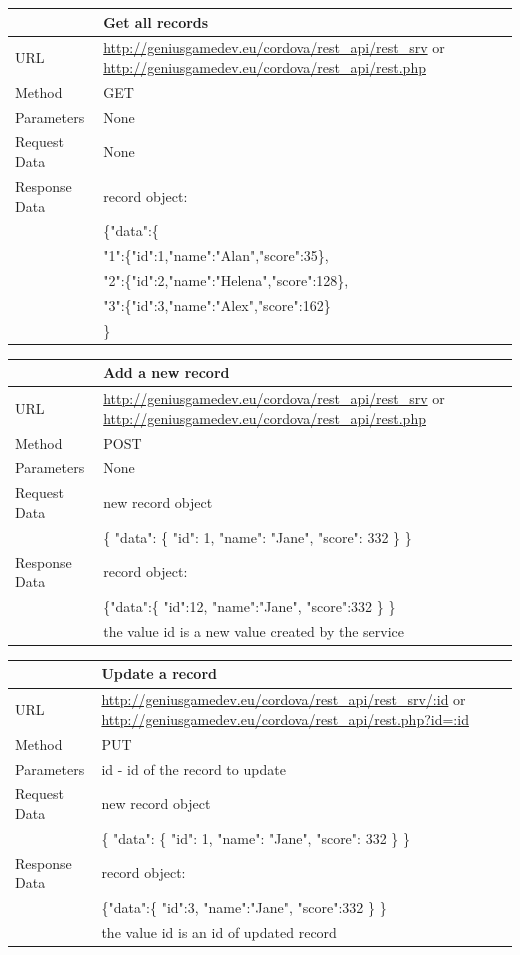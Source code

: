 \begin{tabularx}{\textwidth}{|l|X|}
\hline
&\textbf{Get all records}\\\hline
URL &   \url{http://geniusgamedev.eu/cordova/rest_api/rest_srv} or \url{http://geniusgamedev.eu/cordova/rest_api/rest.php}\\\hline
Method  & GET\\\hline
Parameters  & None \\\hline
Request Data & None\\\hline
Response Data & record object:\\
&
\{"data":\{\\
&"1":\{"id":1,"name":"Alan","score":35\},\\
&"2":\{"id":2,"name":"Helena","score":128\},\\
&"3":\{"id":3,"name":"Alex","score":162\}\\
&\}
\\\hline
\end{tabularx}

\begin{tabularx}{\textwidth}{|l|X|}
\hline
&\textbf{Add a new record}\\\hline
URL &   \url{http://geniusgamedev.eu/cordova/rest_api/rest_srv} or \url{http://geniusgamedev.eu/cordova/rest_api/rest.php}\\\hline
Method  & POST\\\hline
Parameters  & None \\\hline
Request Data & new record object\\
&\{
"data": \{
"id": 1,
"name": "Jane",
"score": 332
\}
\}
\\\hline
Response Data & record object:\\
&
\{"data":\{
    "id":12,
    "name":"Jane",
    "score":332
    \}
\}
\\
&the value id is a new value created by the service
\\\hline
\end{tabularx}

\begin{tabularx}{\textwidth}{|l|X|}
\hline
&\textbf{Update a record}\\\hline
URL &   \url{http://geniusgamedev.eu/cordova/rest_api/rest_srv/:id} or \url{http://geniusgamedev.eu/cordova/rest_api/rest.php?id=:id}\\\hline
Method  & PUT\\\hline
Parameters  & id - id of the record to update \\\hline
Request Data & new record object\\
&\{
"data": \{
"id": 1,
"name": "Jane",
"score": 332
\}
\}
\\\hline
Response Data & record object:\\
&
\{"data":\{
    "id":3,
    "name":"Jane",
    "score":332
    \}
\}
\\
&the value id is an id of updated record
\\\hline
\end{tabularx}

